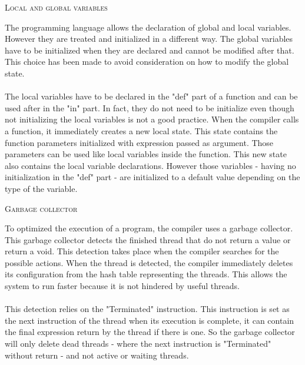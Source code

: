 \documentclass[11pt]{report}
\begin{document}
{}
\tabto{1cm} {\Large \textsc{Local and global variables}}
\vspace*{10pt}

\tabto{1cm}The programming language allows the declaration of global and local variables. However they are treated and initialized in a different way. The global variables have to be initialized when they are declared and cannot be modified after that. This choice has been made to avoid consideration on how to modify the global state.
\\ \\
\tabto{1cm} The local variables have to be declared in the "def" part of a function and can be used after in the "in" part. In fact, they do not need to be initialize even though not initializing the local variables is not a good practice. When the compiler calls a function, it immediately creates a new local state. This state contains the function parameters initialized  with expression passed as argument. Those parameters can be used like local variables inside the function. This new state also contains the local variable declarations. However those variables - having no initialization in the "def" part - are initialized to a default value depending on the type of the variable.

\vspace*{10pt}
\vspace*{10pt}
{}
\tabto{1cm} {\Large \textsc{Garbage collector}}
\vspace*{10pt}

\tabto{1cm}To optimized the execution of a program, the compiler uses a garbage collector. This garbage collector detects the finished thread that do not return a value or return a void. This detection takes place when the compiler searches for the possible actions. When the thread is detected, the compiler immediately deletes its configuration from the hash table representing the threads. This allows the system to run faster because it is not hindered by useful threads. 
\\ \\
\tabto{1cm}This detection relies on the "Terminated" instruction. This instruction is set as the next instruction of the thread when its execution is complete, it can contain the final expression return by the thread if there is one. So the garbage collector will only delete dead threads - where the next instruction is "Terminated" without return - and not active or waiting threads.
\end{document}
